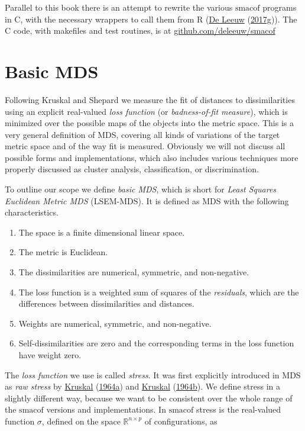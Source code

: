 \documentclass[
  12pt,
]{book}
\providecommand{\tightlist}{%
  \setlength{\itemsep}{0pt}\setlength{\parskip}{0pt}}
\theoremstyle{definition}
\theoremstyle{definition}
\theoremstyle{definition}
\theoremstyle{definition}
\theoremstyle{remark}
\begin{document}
Parallel to this book there is an attempt to rewrite the various \(\textrm{smacof}\)
programs in C, with the necessary wrappers to call them from R (\protect\hyperlink{ref-deleeuw_E_17p}{De Leeuw} (\protect\hyperlink{ref-deleeuw_E_17p}{2017g})). The C code, with makefiles and test routines, is at
\href{https://github.com/deleeuw/smacof}{github.com/deleeuw/smacof}

\hypertarget{introbasic}{%
\section{Basic MDS}\label{introbasic}}

Following Kruskal and Shepard we measure the fit of distances to
dissimilarities using an explicit real-valued \emph{loss function} (or
\emph{badness-of-fit measure}), which is minimized over the possible maps of
the objects into the metric space. This is a very general definition of MDS,
covering all kinds of variations of the target metric space and of the
way fit is measured. Obviously we will not discuss all possible forms and
implementations, which also includes various techniques more properly
discussed as cluster analysis, classification, or discrimination.

To outline our scope we define \emph{basic MDS}, which is short for
\emph{Least Squares Euclidean Metric MDS} (LSEM-MDS). It is defined as MDS
with the following characteristics.

\begin{enumerate}
\def\labelenumi{\arabic{enumi}.}
\tightlist
\item
  The space is a finite dimensional linear space.
\item
  The metric is Euclidean.
\item
  The dissimilarities are numerical, symmetric, and non-negative.
\item
  The loss function is a weighted sum of squares of the \emph{residuals},
  which are the differences between dissimilarities and distances.
\item
  Weights are numerical, symmetric, and non-negative.
\item
  Self-dissimilarities are zero and the corresponding terms in the
  loss function have weight zero.
\end{enumerate}

The \emph{loss function} we use is called \emph{stress}. It was first explicitly introduced in MDS as \emph{raw stress} by \protect\hyperlink{ref-kruskal_64a}{Kruskal} (\protect\hyperlink{ref-kruskal_64a}{1964a}) and \protect\hyperlink{ref-kruskal_64b}{Kruskal} (\protect\hyperlink{ref-kruskal_64b}{1964b}). We define stress in a slightly different way, because we want to be consistent over the whole range of the \(\textrm{smacof}\) versions and implementations. In \(\textrm{smacof}\) stress is the real-valued function \(\sigma\), defined on the space \(\mathbb{R}^{n\times p}\) of configurations, as
\end{document}
